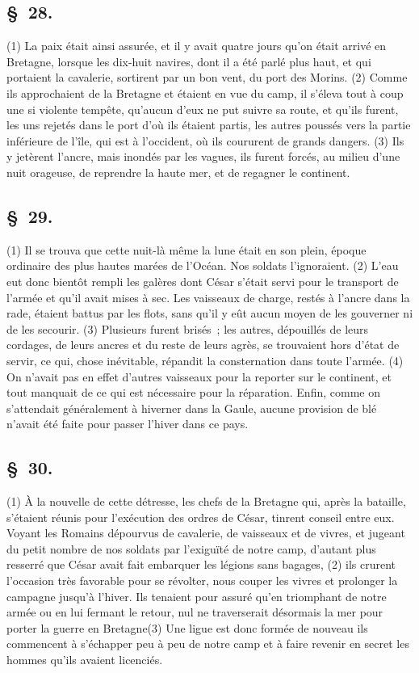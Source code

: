 \documentclass[french,twoside]{book} %
\begin{document}
\subsection[{§ 28.}]{ \textsc{§ 28.} }
\noindent (1) La paix était ainsi assurée, et il y avait quatre jours qu’on était arrivé en Bretagne, lorsque les dix-huit navires, dont il a été parlé plus haut, et qui portaient la cavalerie, sortirent par un bon vent, du port des Morins. (2) Comme ils approchaient de la Bretagne et étaient en vue du camp, il s’éleva tout à coup une si violente tempête, qu’aucun d’eux ne put suivre sa route, et qu’ils furent, les uns rejetés dans le port d’où ils étaient partis, les autres poussés vers la partie inférieure de l’île, qui est à l’occident, où ils coururent de grands dangers. (3) Ils y jetèrent l’ancre, mais inondés par les vagues, ils furent forcés, au milieu d’une nuit orageuse, de reprendre la haute mer, et de regagner le continent.
\subsection[{§ 29.}]{ \textsc{§ 29.} }
\noindent (1) Il se trouva que cette nuit-là même la lune était en son plein, époque ordinaire des plus hautes marées de l’Océan. Nos soldats l’ignoraient. (2) L'eau eut donc bientôt rempli les galères dont César s’était servi pour le transport de l’armée et qu’il avait mises à sec. Les vaisseaux de charge, restés à l’ancre dans la rade, étaient battus par les flots, sans qu’il y eût aucun moyen de les gouverner ni de les secourir. (3) Plusieurs furent brisés ; les autres, dépouillés de leurs cordages, de leurs ancres et du reste de leurs agrès, se trouvaient hors d’état de servir, ce qui, chose inévitable, répandit la consternation dans toute l’armée. (4) On n’avait pas en effet d’autres vaisseaux pour la reporter sur le continent, et tout manquait de ce qui est nécessaire pour la réparation. Enfin, comme on s’attendait généralement à hiverner dans la Gaule, aucune provision de blé n’avait été faite pour passer l’hiver dans ce pays.
\subsection[{§ 30.}]{ \textsc{§ 30.} }
\noindent (1) À la nouvelle de cette détresse, les chefs de la Bretagne qui, après la bataille, s’étaient réunis pour l’exécution des ordres de César, tinrent conseil entre eux. Voyant les Romains dépourvus de cavalerie, de vaisseaux et de vivres, et jugeant du petit nombre de nos soldats par l’exiguïté de notre camp, d’autant plus resserré que César avait fait embarquer les légions sans bagages, (2) ils crurent l’occasion très favorable pour se révolter, nous couper les vivres et prolonger la campagne jusqu’à l’hiver. Ils tenaient pour assuré qu’en triomphant de notre armée ou en lui fermant le retour, nul ne traverserait désormais la mer pour porter la guerre en Bretagne(3) Une ligue est donc formée de nouveau ils commencent à s’échapper peu à peu de notre camp et à faire revenir en secret les hommes qu’ils avaient licenciés.
\end{document}
